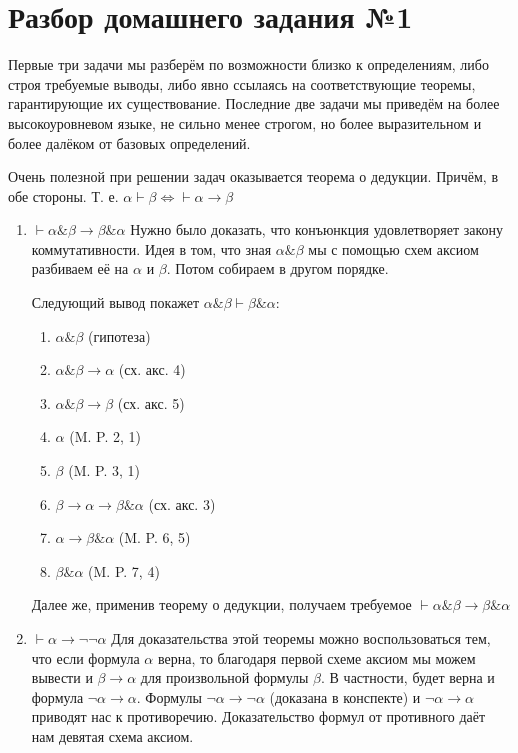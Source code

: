 \documentclass[10pt,a4paper,oneside]{article}
\begin{document}
\section*{Разбор домашнего задания №1}

Первые три задачи мы разберём по возможности близко к определениям, либо строя 
требуемые выводы, либо явно ссылаясь на соответствующие теоремы, гарантирующие их 
существование. Последние две задачи мы приведём на более высокоуровневом языке, 
не сильно менее строгом, но более выразительном и более далёком от базовых определений.

Очень полезной при решении задач оказывается теорема о дедукции. Причём, в обе стороны.
Т. е. $\alpha\vdash\beta \iff \vdash\alpha\rightarrow\beta$


\begin{enumerate}[label=(\alph*)]
\item $\vdash\alpha\&\beta\rightarrow\beta\&\alpha$
\newline
  Нужно было доказать, что конъюнкция удовлетворяет закону коммутативности. 
  Идея в том, что зная $\alpha\&\beta$ мы с помощью схем аксиом разбиваем её 
  на $\alpha$ и $\beta$. Потом собираем в другом порядке.

Следующий вывод покажет $\alpha\&\beta\vdash\beta\&\alpha$:

\begin{enumerate}[label=(\arabic*)]
\item $\alpha\&\beta$ (гипотеза)
\item $\alpha\&\beta\rightarrow\alpha$ (сх. акс. 4)
\item $\alpha\&\beta\rightarrow\beta$ (сх. акс. 5)
\item $\alpha$ (M. P. 2, 1)
\item $\beta$ (M. P. 3, 1)
\item $\beta\rightarrow\alpha\rightarrow\beta\&\alpha$ (сх. акс. 3)
\item $\alpha\rightarrow\beta\&\alpha$ (M. P. 6, 5)
\item $\beta\&\alpha$ (M. P. 7, 4)
\end{enumerate}

Далее же, применив теорему о дедукции, 
получаем требуемое $\vdash\alpha\&\beta\rightarrow\beta\&\alpha$
  
\item $\vdash\alpha \rightarrow \neg\neg \alpha$
\newline
  Для доказательства этой теоремы можно воспользоваться тем, что если 
  формула $\alpha$ верна, то благодаря первой схеме аксиом мы можем 
  вывести и $\beta\rightarrow\alpha$ для произвольной формулы $\beta$. 
  В частности, будет верна и формула $\neg\alpha\rightarrow\alpha$. 
  Формулы $\neg\alpha\rightarrow\neg\alpha$ (доказана в конспекте) и 
  $\neg\alpha\rightarrow\alpha$ приводят нас к противоречию. 
  Доказательство формул от противного даёт нам девятая схема аксиом. 


\end{enumerate}
\end{document}
